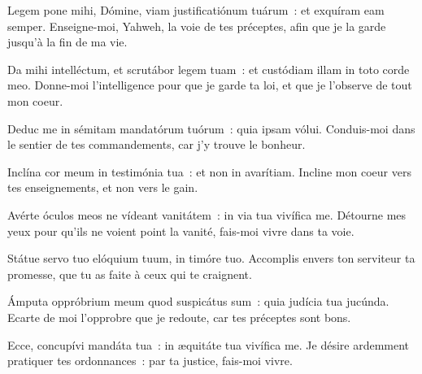 
\begin{paracol}{2}

\LigneParacol{0cm}
{Legem pone mihi, Dómine, viam justificatiónum tuárum~: \GreStar{} et exquíram eam semper.}
{Enseigne-moi, Yahweh, la voie de tes préceptes, afin que je la garde jusqu'à la fin de ma vie.}

\LigneParacol{0.2cm}
{Da mihi intelléctum, et scrutábor legem tuam~: \GreStar{} et custódiam illam in toto corde meo.}
{Donne-moi l'intelligence pour que je garde ta loi, et que je l'observe de tout mon coeur.}

\LigneParacol{0.2cm}
{Deduc me in sémitam mandatórum tuórum~: \GreStar{} quia ipsam vólui.}
{Conduis-moi dans le sentier de tes commandements, car j'y trouve le bonheur.}

\LigneParacol{0.2cm}
{Inclína cor meum in testimónia tua~: \GreStar{} et non in avarítiam.}
{Incline mon coeur vers tes enseignements, et non vers le gain.}

\LigneParacol{0.2cm}
{Avérte óculos meos ne vídeant vanitátem~: \GreStar{} in via tua vivífica me.}
{Détourne mes yeux pour qu'ils ne voient point la vanité, fais-moi vivre dans ta voie.}

\LigneParacol{0.2cm}
{Státue servo tuo elóquium tuum, \GreStar{} in timóre tuo.}
{Accomplis envers ton serviteur ta promesse, que tu as faite à ceux qui te craignent.}

\LigneParacol{0.2cm}
{Ámputa oppróbrium meum quod suspicátus sum~: \GreStar{} quia judícia tua jucúnda.}
{Ecarte de moi l'opprobre que je redoute, car tes préceptes sont bons.}

\LigneParacol{0.2cm}
{Ecce, concupívi mandáta tua~: \GreStar{} in æquitáte tua vivífica me.}
{Je désire ardemment pratiquer tes ordonnances~: par ta justice, fais-moi vivre. }

\end{paracol}
\Gloria

